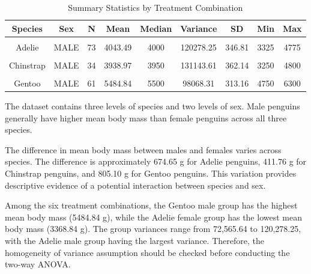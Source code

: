 \documentclass[
  11pt,
]{article}
\begin{document}
\begin{table}[!h]
\centering
\caption{\label{tab:data-treatment-combination-summary}Summary Statistics by Treatment Combination}
\centering
\begin{tabular}[t]{ccccccccc}
\toprule
Species & Sex & N & Mean & Median & Variance & SD & Min & Max\\
\midrule
\cellcolor{gray!10}{Adelie} & \cellcolor{gray!10}{FEMALE} & \cellcolor{gray!10}{73} & \cellcolor{gray!10}{3368.84} & \cellcolor{gray!10}{3400} & \cellcolor{gray!10}{72565.64} & \cellcolor{gray!10}{269.38} & \cellcolor{gray!10}{2850} & \cellcolor{gray!10}{3900}\\
Adelie & MALE & 73 & 4043.49 & 4000 & 120278.25 & 346.81 & 3325 & 4775\\
\cellcolor{gray!10}{Chinstrap} & \cellcolor{gray!10}{FEMALE} & \cellcolor{gray!10}{34} & \cellcolor{gray!10}{3527.21} & \cellcolor{gray!10}{3550} & \cellcolor{gray!10}{81415.44} & \cellcolor{gray!10}{285.33} & \cellcolor{gray!10}{2700} & \cellcolor{gray!10}{4150}\\
Chinstrap & MALE & 34 & 3938.97 & 3950 & 131143.61 & 362.14 & 3250 & 4800\\
\cellcolor{gray!10}{Gentoo} & \cellcolor{gray!10}{FEMALE} & \cellcolor{gray!10}{58} & \cellcolor{gray!10}{4679.74} & \cellcolor{gray!10}{4700} & \cellcolor{gray!10}{79286.34} & \cellcolor{gray!10}{281.58} & \cellcolor{gray!10}{3950} & \cellcolor{gray!10}{5200}\\
\addlinespace
Gentoo & MALE & 61 & 5484.84 & 5500 & 98068.31 & 313.16 & 4750 & 6300\\
\bottomrule
\end{tabular}
\end{table}

The dataset contains three levels of species and two levels of sex. Male
penguins generally have higher mean body mass than female penguins
across all three species.

The difference in mean body mass between males and females varies across
species. The difference is approximately 674.65 g for Adelie penguins,
411.76 g for Chinstrap penguins, and 805.10 g for Gentoo penguins. This
variation provides descriptive evidence of a potential interaction
between species and sex.

Among the six treatment combinations, the Gentoo male group has the
highest mean body mass (5484.84 g), while the Adelie female group has
the lowest mean body mass (3368.84 g). The group variances range from
72,565.64 to 120,278.25, with the Adelie male group having the largest
variance. Therefore, the homogeneity of variance assumption should be
checked before conducting the two-way ANOVA.
\end{document}
